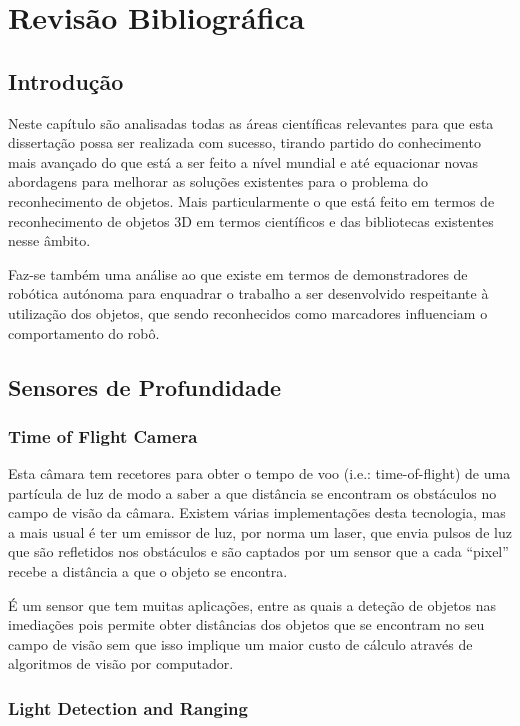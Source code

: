 \chapter{Revisão Bibliográfica} \label{chap:sota}

\section{Introdução}

Neste capítulo são analisadas todas as áreas científicas relevantes para que esta dissertação possa ser realizada com sucesso, tirando partido do conhecimento mais avançado do que está a ser feito a nível mundial e até equacionar novas abordagens para melhorar as soluções existentes para o problema do reconhecimento de objetos. Mais particularmente o que está feito em termos de reconhecimento de objetos 3D em termos científicos e das bibliotecas existentes nesse âmbito.

Faz-se também uma análise ao que existe em termos de demonstradores de robótica autónoma para enquadrar o trabalho a ser desenvolvido respeitante à utilização dos objetos, que sendo reconhecidos como marcadores influenciam o comportamento do robô.

\section{Sensores de Profundidade}

\subsection{Time of Flight Camera}

Esta câmara tem recetores para obter o tempo de voo (i.e.: time-of-flight)
de uma partícula de luz de modo a saber a que distância se encontram os
obstáculos no campo de visão da câmara. Existem várias implementações desta
tecnologia, mas a mais usual é ter um emissor de luz, por norma um laser,
que envia pulsos de luz que são refletidos nos obstáculos e são captados por
um sensor que a cada “pixel” recebe a distância a que o objeto se encontra.

É um sensor que tem muitas aplicações, entre as quais a deteção de objetos nas imediações pois permite obter distâncias dos objetos que se encontram no seu campo de visão sem que isso implique um maior custo de cálculo através de algoritmos de visão por computador. 

\subsection[LIDAR]{Light Detection and Ranging}

